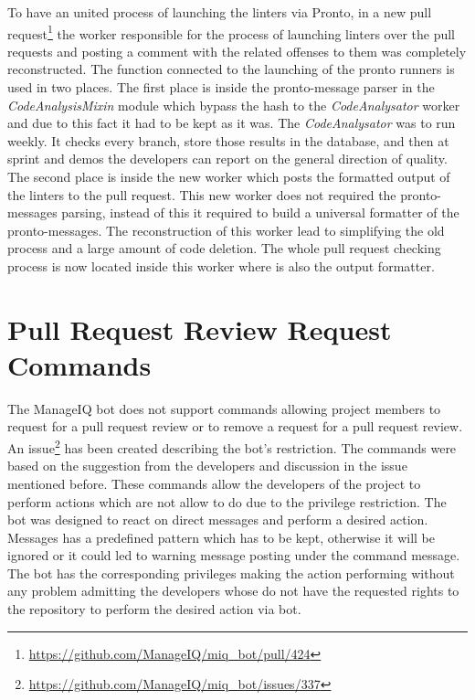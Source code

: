 To have an united process of launching the linters via Pronto, in a new pull request\footnote{\url{https://github.com/ManageIQ/miq_bot/pull/424}} the worker responsible for the process of launching linters over the pull requests and posting a comment with the related offenses to them was completely reconstructed. The function connected to the launching of the pronto runners is used in two places. The first place is inside the pronto-message parser in the \textit{CodeAnalysisMixin} module which bypass the hash to the \textit{CodeAnalysator} worker and due to this fact it had to be kept as it was. The \textit{CodeAnalysator} was to run weekly. It checks every branch, store those results in the database, and then at sprint and demos the developers can report on the general direction of quality. The second place is inside the new worker which posts the formatted output of the linters to the pull request. This new worker does not required the pronto-messages parsing, instead of this it required to build a universal formatter of the pronto-messages.  The reconstruction of this worker lead to simplifying the old process and a large amount of code deletion. The whole pull request checking process is now located inside this worker where is also the output formatter.

\section{Pull Request Review Request Commands}

The ManageIQ bot does not support commands allowing project members to request for a pull request review or to remove a request for a pull request review. An issue\footnote{\url{https://github.com/ManageIQ/miq_bot/issues/337}} has been created describing the bot's restriction. The commands were based on the suggestion from the developers and discussion in the issue mentioned before. These commands allow the developers of the project to perform actions which are not allow to do due to the privilege restriction. The bot was designed to react on direct messages and perform a desired action. Messages has a predefined pattern which has to be kept, otherwise it will be ignored or it could led to warning message posting under the command message. The bot has the corresponding privileges making the action performing without any problem admitting the developers whose do not have the requested rights to the repository to perform the desired action via bot.


